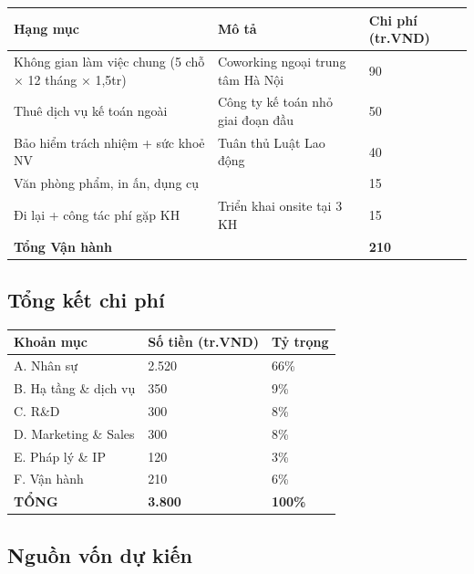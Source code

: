 \documentclass[11pt,a4paper]{article}
\begin{document}
\begin{longtable}{|L{6cm}|L{4cm}|R{2.2cm}|}
\hline
{}\textbf{Hạng mục} & \textbf{Mô tả} & \textbf{Chi phí (tr.VND)} \\
\hline\endhead

Không gian làm việc chung (5 chỗ × 12 tháng × 1,5tr) & Coworking ngoại trung tâm Hà Nội & 90 \\ \hline
Thuê dịch vụ kế toán ngoài & Công ty kế toán nhỏ giai đoạn đầu & 50 \\ \hline
Bảo hiểm trách nhiệm + sức khoẻ NV & Tuân thủ Luật Lao động & 40 \\ \hline
Văn phòng phẩm, in ấn, dụng cụ & & 15 \\ \hline
Đi lại + công tác phí gặp KH & Triển khai onsite tại 3 KH & 15 \\ \hline
\textbf{Tổng Vận hành} & & \textbf{210} \\ \hline

\end{longtable}

\subsection{Tổng kết chi phí}

\begin{center}
\begin{tabular}{|L{6cm}|R{2.5cm}|R{2cm}|}
\hline
{}\textbf{Khoản mục} & \textbf{Số tiền (tr.VND)} & \textbf{Tỷ trọng} \\ \hline
A. Nhân sự & 2.520 & 66\% \\ \hline
B. Hạ tầng \& dịch vụ & 350 & 9\% \\ \hline
C. R\&D & 300 & 8\% \\ \hline
D. Marketing \& Sales & 300 & 8\% \\ \hline
E. Pháp lý \& IP & 120 & 3\% \\ \hline
F. Vận hành & 210 & 6\% \\ \hline
\textbf{TỔNG} & \textbf{3.800} & \textbf{100\%} \\ \hline
\end{tabular}
\end{center}

\subsection{Nguồn vốn dự kiến}
\end{document}
